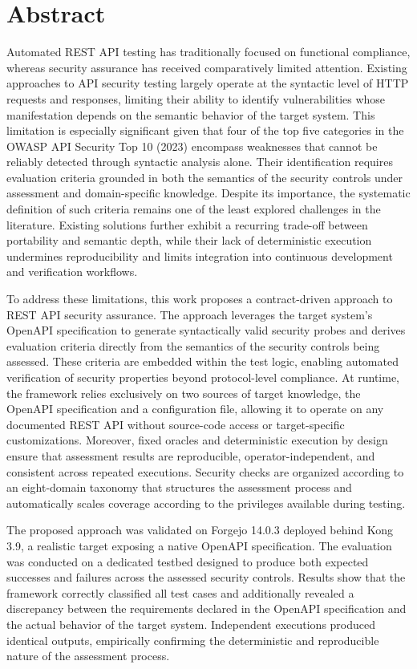 \chapter*{Abstract}

Automated REST API testing has traditionally focused on functional compliance, whereas security assurance has received comparatively limited attention. Existing approaches to API security testing largely operate at the syntactic level of HTTP requests and responses, limiting their ability to identify vulnerabilities whose manifestation depends on the semantic behavior of the target system. This limitation is especially significant given that four of the top five categories in the OWASP API Security Top 10 (2023) encompass weaknesses that cannot be reliably detected through syntactic analysis alone. Their identification requires evaluation criteria grounded in both the semantics of the security controls under assessment and domain-specific knowledge. Despite its importance, the systematic definition of such criteria remains one of the least explored challenges in the literature. Existing solutions further exhibit a recurring trade-off between portability and semantic depth, while their lack of deterministic execution undermines reproducibility and limits integration into continuous development and verification workflows.

To address these limitations, this work proposes a contract-driven approach to REST API security assurance. The approach leverages the target system's OpenAPI specification to generate syntactically valid security probes and derives evaluation criteria directly from the semantics of the security controls being assessed. These criteria are embedded within the test logic, enabling automated verification of security properties beyond protocol-level compliance. At runtime, the framework relies exclusively on two sources of target knowledge, the OpenAPI specification and a configuration file, allowing it to operate on any documented REST API without source-code access or target-specific customizations. Moreover, fixed oracles and deterministic execution by design ensure that assessment results are reproducible, operator-independent, and consistent across repeated executions. Security checks are organized according to an eight-domain taxonomy that structures the assessment process and automatically scales coverage according to the privileges available during testing.

The proposed approach was validated on Forgejo 14.0.3 deployed behind Kong 3.9, a realistic target exposing a native OpenAPI specification. The evaluation was conducted on a dedicated testbed designed to produce both expected successes and failures across the assessed security controls. Results show that the framework correctly classified all test cases and additionally revealed a discrepancy between the requirements declared in the OpenAPI specification and the actual behavior of the target system. Independent executions produced identical outputs, empirically confirming the deterministic and reproducible nature of the assessment process.

